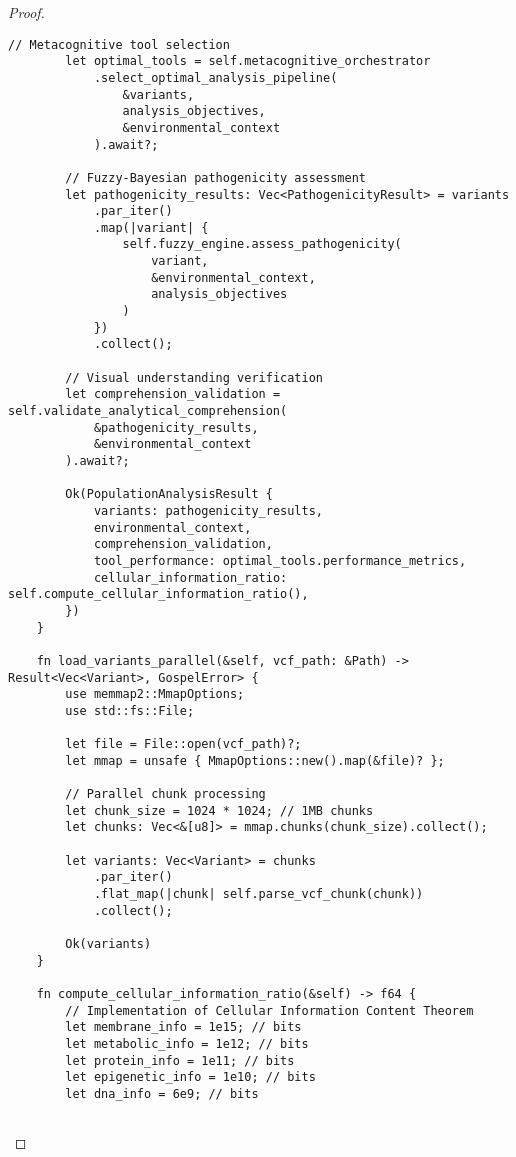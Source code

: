 \documentclass[12pt,a4paper]{article}
\begin{document}
\begin{proof}
\begin{lstlisting}[style=ruststyle, caption=High-Performance Genomic Processing Core]
        // Metacognitive tool selection
        let optimal_tools = self.metacognitive_orchestrator
            .select_optimal_analysis_pipeline(
                &variants, 
                analysis_objectives,
                &environmental_context
            ).await?;
        
        // Fuzzy-Bayesian pathogenicity assessment
        let pathogenicity_results: Vec<PathogenicityResult> = variants
            .par_iter()
            .map(|variant| {
                self.fuzzy_engine.assess_pathogenicity(
                    variant,
                    &environmental_context,
                    analysis_objectives
                )
            })
            .collect();
        
        // Visual understanding verification
        let comprehension_validation = self.validate_analytical_comprehension(
            &pathogenicity_results,
            &environmental_context
        ).await?;
        
        Ok(PopulationAnalysisResult {
            variants: pathogenicity_results,
            environmental_context,
            comprehension_validation,
            tool_performance: optimal_tools.performance_metrics,
            cellular_information_ratio: self.compute_cellular_information_ratio(),
        })
    }
    
    fn load_variants_parallel(&self, vcf_path: &Path) -> Result<Vec<Variant>, GospelError> {
        use memmap2::MmapOptions;
        use std::fs::File;
        
        let file = File::open(vcf_path)?;
        let mmap = unsafe { MmapOptions::new().map(&file)? };
        
        // Parallel chunk processing
        let chunk_size = 1024 * 1024; // 1MB chunks
        let chunks: Vec<&[u8]> = mmap.chunks(chunk_size).collect();
        
        let variants: Vec<Variant> = chunks
            .par_iter()
            .flat_map(|chunk| self.parse_vcf_chunk(chunk))
            .collect();
        
        Ok(variants)
    }
    
    fn compute_cellular_information_ratio(&self) -> f64 {
        // Implementation of Cellular Information Content Theorem
        let membrane_info = 1e15; // bits
        let metabolic_info = 1e12; // bits  
        let protein_info = 1e11; // bits
        let epigenetic_info = 1e10; // bits
        let dna_info = 6e9; // bits
        

\end{lstlisting}
\end{proof}
\end{document}

